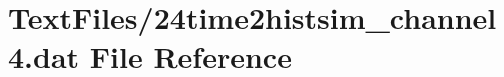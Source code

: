 \hypertarget{24time2histsim__channel4_8dat}{}\section{Text\+Files/24time2histsim\+\_\+channel4.dat File Reference}
\label{24time2histsim__channel4_8dat}
